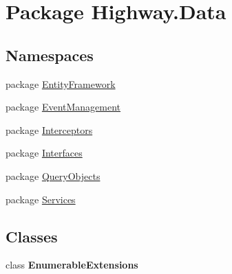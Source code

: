 \hypertarget{namespace_highway_1_1_data}{\section{Package Highway.\-Data}
\label{namespace_highway_1_1_data}
}
\subsection*{Namespaces}
\begin{DoxyCompactItemize}
\item 
package \hyperlink{namespace_highway_1_1_data_1_1_entity_framework}{Entity\-Framework}
\item 
package \hyperlink{namespace_highway_1_1_data_1_1_event_management}{Event\-Management}
\item 
package \hyperlink{namespace_highway_1_1_data_1_1_interceptors}{Interceptors}
\item 
package \hyperlink{namespace_highway_1_1_data_1_1_interfaces}{Interfaces}
\item 
package \hyperlink{namespace_highway_1_1_data_1_1_query_objects}{Query\-Objects}
\item 
package \hyperlink{namespace_highway_1_1_data_1_1_services}{Services}
\end{DoxyCompactItemize}
\subsection*{Classes}
\begin{DoxyCompactItemize}
\item 
class {\bfseries Enumerable\-Extensions}
\end{DoxyCompactItemize}
